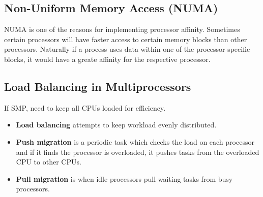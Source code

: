 \documentclass{article}
\begin{document}
\subsection{Non-Uniform Memory Access (NUMA)}
NUMA is one of the reasons for implementing processor affinity.
Sometimes certain processors will have faster access to certain memory blocks than other processors. 
Naturally if a process uses data within one of the processor-specific blocks, it would have a greate affinity for the respective processor.

\subsection{Load Balancing in Multiprocessors}
If SMP, need to keep all CPUs loaded for efficiency.

\begin{itemize}
	\item \textbf{Load balancing} attempts to keep workload evenly distributed.
	\item \textbf{Push migration} is a periodic task which checks the load on each processor and if it finds the processor is overloaded, it pushes tasks from the overloaded CPU to other CPUs.
	\item \textbf{Pull migration} is when idle processors pull waiting tasks from busy processors.
\end{itemize}
\end{document}
